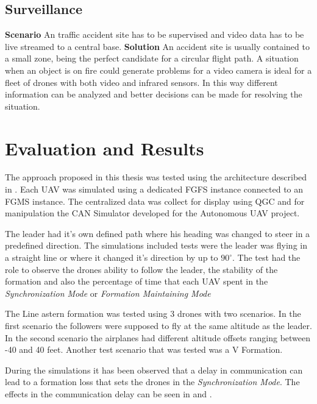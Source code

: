 \subsection{Surveillance}
\textbf{Scenario} \newline
An traffic accident site has to be supervised and video data has to be live
streamed to a central base.
\textbf{Solution}
An accident site is usually contained to a small zone, being the perfect
candidate for a circular flight path. A situation when an object is on fire could
generate problems for a video camera is ideal for a fleet of drones with 
both video and infrared sensors. In this way different information can be 
analyzed and better decisions can be made for resolving the situation.

\section{Evaluation and Results}
The approach proposed in this thesis was tested using the architecture described in
. Each UAV was simulated
using a dedicated FGFS instance connected to an FGMS instance. The centralized
data was collect for display using QGC and for manipulation the CAN Simulator
developed for the Autonomous UAV project.

The leader had it's own defined path where his heading was changed to steer in
a predefined direction. The simulations included tests were the leader
was flying in a straight line or where it changed it's direction by up to 
$90^{\circ}$. The test had the role to observe the drones ability to follow
the leader,  the stability of the formation and also the percentage of time
that each UAV spent in the \textit{Synchronization Mode} or \textit{Formation Maintaining
  Mode}
  

The Line astern formation was tested using 3 drones with two scenarios. In 
the first scenario the followers were supposed to fly at the same altitude
as the leader. In the second scenario the airplanes had different altitude offsets
ranging between -40 and 40 feet. Another test scenario that was tested was 
a V Formation.

During the simulations it has been observed that a delay in communication 
can lead to a formation loss that sets the drones in the \textit{Synchronization Mode}.
The effects in the communication delay can be seen in 
and .

